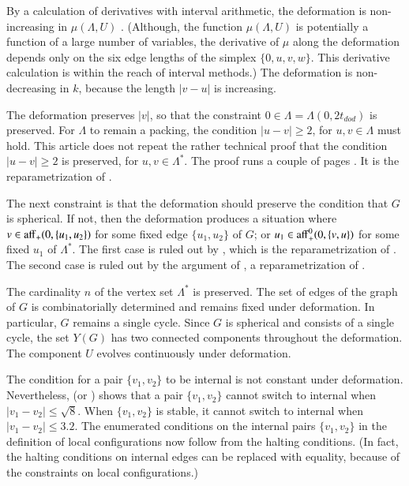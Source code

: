 \documentclass{article} %
\begin{document}
By a calculation of derivatives with interval arithmetic,
the deformation is non-increasing in $\mu(\Lambda,U)$ \cite[Lemma~7.7]{Hales:2002:Dodec}.  (Although, the function $\mu(\Lambda,U)$ is potentially a 
function of a large number of variables, the derivative of $\mu$
along the deformation depends only on the six edge lengths  of
the simplex $\{0,u,v,w\}$.  This derivative calculation is within
the reach of interval methods.)
The deformation is non-decreasing in $k$, because the length
$|v-u|$ is increasing.

The deformation preserves $|v|$,
so that the constraint $0\in\Lambda=\Lambda(0,2t_{dod})$ is preserved.
For $\Lambda$ to remain a packing,  the condition
 $|u-v|\ge 2$, for $u,v\in \Lambda$ must hold.
This article does not repeat the rather technical proof that
the condition
 $|u-v|\ge 2$ is preserved, for $u,v\in\Lambda^*$.  The proof
runs a couple  of pages \cite[Lemma~7.6]{Hales:2002:Dodec}.
It is the reparametrization of \cite[Lemma~12.20]{Hales:2006:DCG}.

The next constraint is that the deformation should preserve the condition
that $G$ is spherical.  
If not, then the deformation produces
a situation where $v\in {\operatorname{aff}}_+(0,\{u_1,u_2\})$ for some fixed edge $\{u_1,u_2\}$
of $G$; or $u_1\in {\operatorname{aff}}_+^0(0,\{v,u\})$ for some fixed $u_1$ of $\Lambda^*$.
The first case is ruled out by \cite[Remark~p.22]{Hales:2002:Dodec}, which is the reparametrization of \cite[\S12.7,p.132]{Hales:2006:DCG}.  The second case is ruled out by 
the argument of \cite[p.27]{Hales:2002:Dodec}, a reparametrization of 
\cite[\S12.8,p.134]{Hales:2006:DCG}.

The cardinality $n$ of the vertex set $\Lambda^*$ is preserved.
The set of edges of the graph of $G$ is combinatorially determined and
remains fixed under deformation.  In particular, $G$ remains a single
cycle.  Since $G$ is spherical and consists of a single
cycle, the set $Y(G)$ has two connected components throughout the
deformation.  The component $U$ evolves continuously under deformation.   

The condition for a pair $\{v_1,v_2\}$ to be
internal is not constant under deformation.  Nevertheless,
\cite[p.23]{Hales:2002:Dodec} (or \cite[p.132]{Hales:2006:DCG}) 
shows that a pair $\{v_1,v_2\}$
cannot switch to internal when $|v_1-v_2| \le \sqrt8$.  When $\{v_1,v_2\}$ is stable,
it cannot switch to internal when $|v_1-v_2|\le 3.2$. 
The enumerated conditions on the
internal pairs $\{v_1,v_2\}$ in the definition of local configurations
now follow from the halting conditions. (In fact, the halting conditions on internal edges
can be replaced with equality, because of the
constraints on local configurations.)
\end{document}
